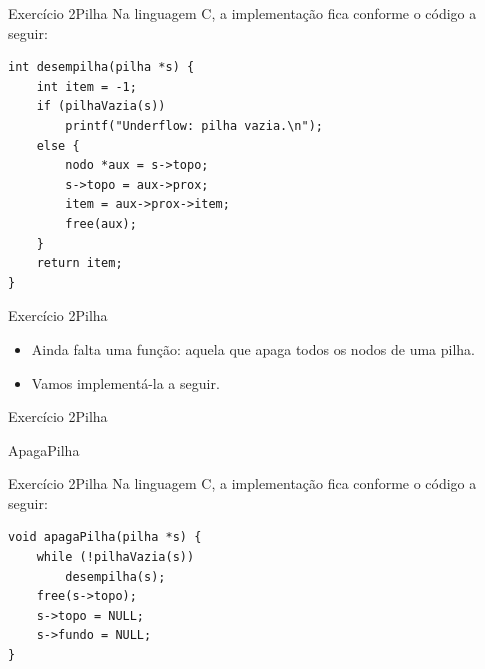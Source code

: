 \documentclass[aspectratio=169]{beamer}
\begin{document}
\begin{frame}[fragile]{Exercício 2}{Pilha}
Na linguagem C, a implementação fica conforme o código a seguir:
\begin{lstlisting}[style=CStyle]
int desempilha(pilha *s) {
    int item = -1;
    if (pilhaVazia(s)) 
        printf("Underflow: pilha vazia.\n");
    else {
        nodo *aux = s->topo;
        s->topo = aux->prox;
        item = aux->prox->item;
        free(aux);
    }
    return item;    
}
\end{lstlisting}  
\end{frame}


\begin{frame}[fragile]{Exercício 2}{Pilha}
\begin{itemize}
\item Ainda falta uma função: aquela que apaga todos os nodos de uma pilha.
\item Vamos implementá-la a seguir.
\end{itemize}
\end{frame}


\begin{frame}[fragile]{Exercício 2}{Pilha}
\begin{algorithm}[H]
\caption{ApagaPilha} 
\label{ApagaPilha}
\end{algorithm}
\end{frame}


\begin{frame}[fragile]{Exercício 2}{Pilha}
Na linguagem C, a implementação fica conforme o código a seguir:
\begin{lstlisting}[style=CStyle]
void apagaPilha(pilha *s) {
    while (!pilhaVazia(s))
        desempilha(s); 
    free(s->topo);
    s->topo = NULL;
    s->fundo = NULL;
}  
\end{lstlisting}  
\end{frame}
\end{document}
